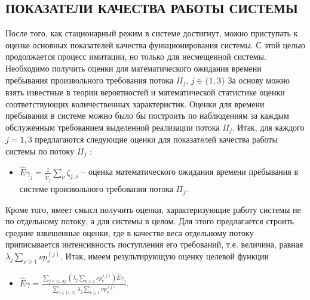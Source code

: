 \documentclass[11pt]{ubs}
\begin{document}
\subsection{ПОКАЗАТЕЛИ КАЧЕСТВА РАБОТЫ СИСТЕМЫ}
После того, как стационарный режим в системе достигнут, можно приступать к оценке основных показателей качества функционирования системы. С этой целью продолжается процесс имитации, но только для несмещенной системы. Необходимо получить оценки для математического ожидания времени пребывания произвольного требования потока $\Pi_j$, $j\in \{1, 3\}$
За основу можно взять известные в теории вероятностей и математической статистике оценки соответствующих количественных характеристик. Оценки для времени пребывания в системе можно было бы построить по наблюдениям за каждым обслуженным требованием выделенной реализации потока $\Pi_j$.
Итак, для каждого $j=1,3$  предлагаются следующие оценки для показателей качества работы системы по потоку $\Pi_j$ :
\begin{itemize}
    \item $\hat{E}\gamma_{j}=\frac{1}{\tilde{\mathcal{V}}_j}\sum_{\nu}\zeta_{j,\nu}$  -- оценка математического ожидания времени пребывания в системе произвольного требования потока $\Pi_j$.
\end{itemize}
Кроме того, имеет смысл получить оценки, характеризующие работу системы не по отдельному потоку, а для системы в целом. Для этого предлагается строить средние взвешенные оценки, где в качестве веса отдельному потоку  приписывается интенсивность поступления его требований, т.е. величина, равная $\lambda_j \sum_{\nu\geqslant1}\nu p_{\nu}^{(j)}$. Итак, имеем результирующую оценку целевой функции
\begin{itemize}
    \item $\hat{E}\gamma=\frac{\sum_{j\in\{1,3\}} (\lambda_j \sum_{\nu\geqslant1}\nu p_{\nu}^{(j)})\hat{E}\gamma_{j} }{\sum_{j\in\{1,3\}} \lambda_j \sum_{\nu\geqslant1}\nu p_{\nu}^{(j)}}$.
\end{itemize}
\end{document}
